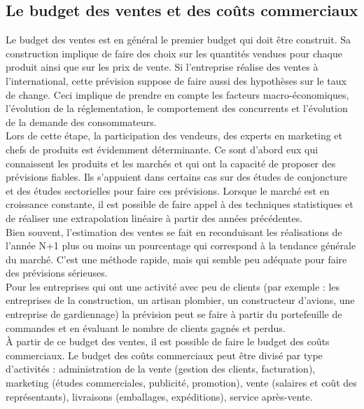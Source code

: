 \documentclass{kaobook}
\begin{document}
\subsection{Le budget des ventes et des coûts commerciaux}
\label{sec:org8219795}
Le budget des ventes est en général le premier budget qui doit être construit. Sa construction implique de faire des choix sur les quantités vendues pour chaque produit ainsi que sur les prix de vente. Si l'entreprise réalise des ventes à l'international, cette prévision suppose de faire aussi des hypothèses sur le taux de change. Ceci implique de prendre en compte les facteurs macro-économiques, l'évolution de la réglementation, le comportement des concurrents et l'évolution de la demande des consommateurs.\\
Lors de cette étape, la participation des vendeurs, des experts en marketing et chefs de produits est évidemment déterminante. Ce sont d'abord eux qui connaissent les produits et les marchés et qui ont la capacité de proposer des prévisions fiables. Ils s'appuient dans certains cas sur des études de conjoncture et des études sectorielles pour faire ces prévisions. Lorsque le marché est en croissance constante, il est possible de faire appel à des techniques statistiques et de réaliser une extrapolation linéaire à partir des années précédentes.\\
Bien souvent, l'estimation des ventes se fait en reconduisant les réalisations de l'année N+1 plus ou moins un pourcentage qui correspond à la tendance générale du marché. C'est une méthode rapide, mais qui semble peu adéquate pour faire des prévisions sérieuses.\\
Pour les entreprises qui ont une activité avec peu de clients (par exemple : les entreprises de la construction, un artisan plombier, un constructeur d'avions, une entreprise de gardiennage) la prévision peut se faire à partir du portefeuille de commandes et en évaluant le nombre de clients gagnés et perdus.\\
À partir de ce budget des ventes, il est possible de faire le budget des coûts commerciaux. Le budget des coûts commerciaux peut être divisé par type d'activités : administration de la vente (gestion des clients, facturation), marketing (études commerciales, publicité, promotion), vente (salaires et coût des représentants), livraisons (emballages, expéditions), service après-vente.\\
\end{document}

